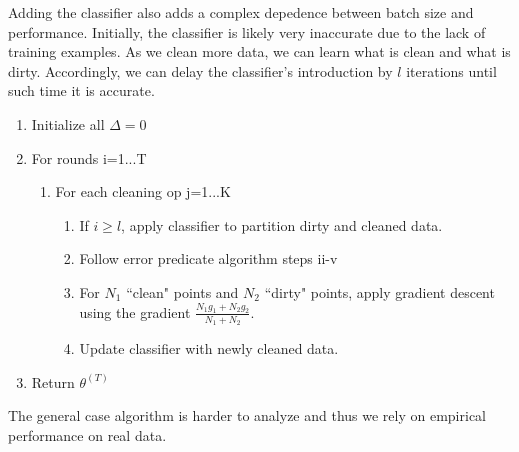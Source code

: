 Adding the classifier also adds a complex depedence between batch size and performance.
Initially, the classifier is likely very inaccurate due to the lack of training examples.
As we clean more data, we can learn what is clean and what is dirty.
Accordingly, we can delay the classifier's introduction by $l$ iterations until such time it is accurate. 

\begin{enumerate}[noitemsep]
\item Initialize all $\Delta = 0$
\item For rounds i=1...T
\begin{enumerate}
	\item For each cleaning op j=1...K
	\begin{enumerate}
		\item If $i \ge l$, apply classifier to partition dirty and cleaned data.
		\item Follow error predicate algorithm steps ii-v
		\item For $N_1$ ``clean" points and $N_2$ ``dirty" points, apply gradient descent using the gradient $\frac{N_1g_1 + N_2g_2}{N_1 + N_2}$.
		\item Update classifier with newly cleaned data.
	\end{enumerate}
\end{enumerate}
\item Return $\theta^{(T)}$
\end{enumerate} 

The general case algorithm is harder to analyze and thus we rely on empirical performance on real data.




